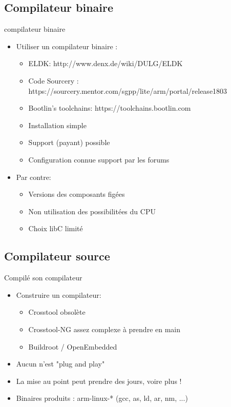 \subsection{Compilateur binaire}
\begin{frame}{compilateur binaire}
  \begin{itemize}
  \item Utiliser un compilateur binaire :
    \begin{itemize}
    \item ELDK: http://www.denx.de/wiki/DULG/ELDK
    \item Code Sourcery : https://sourcery.mentor.com/sgpp/lite/arm/portal/release1803
    \item Bootlin's toolchains: https://toolchains.bootlin.com
    \item Installation simple
    \item Support (payant) possible
    \item Configuration connue \MVRightarrow support par les forums
    \end{itemize}
  \item Par contre:
    \begin{itemize}
    \item Versions des composants figées
    \item Non utilisation des possibilitées du CPU
    \item Choix libC limité
    \end{itemize}
  \end{itemize}
\end{frame}

\subsection{Compilateur source}
\begin{frame}{Compilé son compilateur}
  \begin{itemize}
  \item Construire un compilateur:
    \begin{itemize}
    \item Crosstool \MVRightarrow obsolète
    \item Crosstool-NG \MVRightarrow assez complexe à prendre en main
    \item Buildroot / OpenEmbedded
    \end{itemize}
  \item Aucun n'est "plug and play"
  \item La mise au point peut prendre des jours, voire plus !
  \item Binaires produits : arm-linux-* (gcc, as, ld, ar, nm, ...)
  \end{itemize}
\end{frame}

